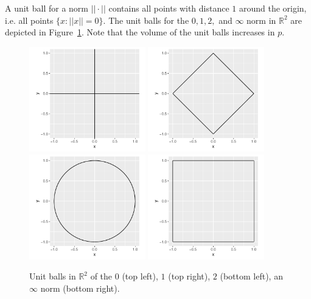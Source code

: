 \documentclass[12pt, twoside]{article}
\newcommand{\R}{\mathbb{R}}
\newcommand{\1}{\mathbb{1}}
\begin{document}
A unit ball for a norm $||\cdot||$ contains all points with distance $1$ around the origin, i.e. all points $\{x: ||x|| = 0\}$. The unit balls for the $0, 1, 2,$ and $\infty$ norm in $\R^2$ are depicted in Figure~\ref{fig:input}. Note that the volume of the unit balls increases in $p$.
\begin{figure}[ht]
    \centering
    \includegraphics[width=0.45\textwidth]{plots/unit_circle_0.pdf}
    \includegraphics[width=0.45\textwidth]{plots/unit_circle_1.pdf}
    \includegraphics[width=0.45\textwidth]{plots/unit_circle_2.pdf}
    \includegraphics[width=0.45\textwidth]{plots/unit_circle_inf.pdf}
    \caption{Unit balls in $\R^2$ of the $0$ (top left), $1$ (top right), $2$ (bottom left), an $\infty$ norm (bottom right).}
    \label{fig:input}
\end{figure}
\end{document}
